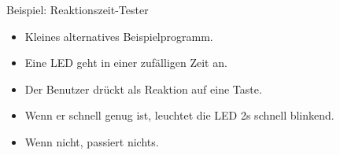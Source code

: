 \documentclass[12pt]{beamer}
\begin{document}
\begin{frame}{Beispiel: Reaktionszeit-Tester}
\begin{itemize}
\item Kleines alternatives Beispielprogramm.
\item Eine LED geht in einer zufälligen Zeit an.
\item Der Benutzer drückt als Reaktion auf eine Taste.
\item Wenn er schnell genug ist, leuchtet die LED 2s schnell blinkend.
\item Wenn nicht, passiert nichts.
\end{itemize}
\end{frame}
\end{document}
